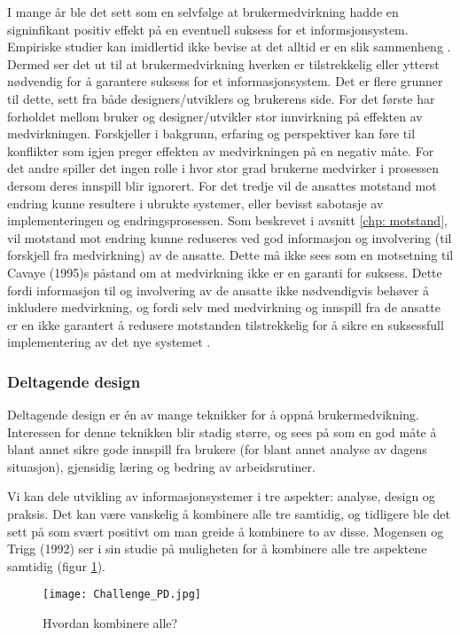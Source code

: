 \noindent
I mange år ble det sett som en selvfølge at brukermedvirkning hadde en signinfikant positiv effekt på en eventuell suksess for et informsjonsystem. Empiriske studier kan imidlertid ikke bevise at det alltid er en slik sammenheng \cite{Cavaye95}. Dermed ser det ut til at brukermedvirkning hverken er tilstrekkelig eller ytterst nødvendig for å garantere suksess for et informasjonsystem. 
Det er flere grunner til dette, sett fra både designers/utviklers og brukerens side. For det første har forholdet mellom bruker og designer/utvikler stor innvirkning på effekten av medvirkningen. Forskjeller i bakgrunn, erfaring og perspektiver kan føre til konflikter som igjen preger effekten av medvirkningen på en negativ måte. For det andre spiller det ingen rolle i hvor stor grad brukerne medvirker i prosessen dersom deres innspill blir ignorert. For det tredje vil de ansattes motstand mot endring kunne resultere i ubrukte systemer, eller bevisst sabotasje av implementeringen og endringsprosessen. Som beskrevet i avsnitt \ref{chp: motstand}, vil motstand mot endring kunne reduseres ved god informasjon og involvering (til forskjell fra medvirkning) av de ansatte. Dette må ikke sees som en motsetning til Cavaye (1995)s påstand om at medvirkning ikke er en garanti for suksess. Dette fordi informasjon til og involvering av de ansatte ikke nødvendigvis behøver å inkludere medvirkning, og fordi selv med medvirkning og innspill fra de ansatte er en ikke garantert å redusere motstanden tilstrekkelig for å sikre en suksessfull implementering av det nye systemet \cite{Cavaye95}.

\subsubsection{Deltagende design}
\label{dd}
Deltagende design er én av mange teknikker for å oppnå brukermedvikning.
Interessen for denne teknikken blir stadig større, og sees på som en god måte å blant annet sikre gode innspill fra brukere (for blant annet analyse av dagens situasjon), gjensidig læring og bedring av arbeidsrutiner.

\noindent
Vi kan dele utvikling av informasjonsystemer i tre aspekter: analyse, design og praksis. Det kan være vanskelig å kombinere alle tre samtidig, og tidligere ble det sett på som svært positivt om man greide å kombinere to av disse. Mogensen og Trigg (1992) ser i sin studie på muligheten for å kombinere alle tre aspektene samtidig (figur \ref{Challenge_PD}).

\begin{figure}[H]
\centering
\texttt{[image: Challenge\_PD.jpg]}
\caption{Hvordan kombinere alle?}
\label{Challenge_PD}
\end{figure}

